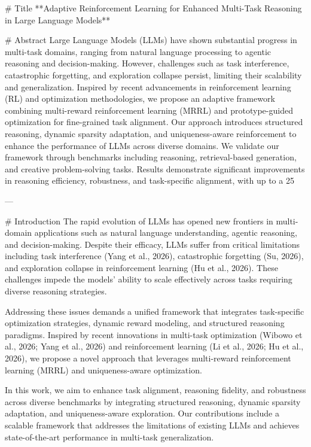 # Title  
**Adaptive Reinforcement Learning for Enhanced Multi-Task Reasoning in Large Language Models**  

# Abstract  
Large Language Models (LLMs) have shown substantial progress in multi-task domains, ranging from natural language processing to agentic reasoning and decision-making. However, challenges such as task interference, catastrophic forgetting, and exploration collapse persist, limiting their scalability and generalization. Inspired by recent advancements in reinforcement learning (RL) and optimization methodologies, we propose an adaptive framework combining multi-reward reinforcement learning (MRRL) and prototype-guided optimization for fine-grained task alignment. Our approach introduces structured reasoning, dynamic sparsity adaptation, and uniqueness-aware reinforcement to enhance the performance of LLMs across diverse domains. We validate our framework through benchmarks including reasoning, retrieval-based generation, and creative problem-solving tasks. Results demonstrate significant improvements in reasoning efficiency, robustness, and task-specific alignment, with up to a 25%

---

# Introduction  
The rapid evolution of LLMs has opened new frontiers in multi-domain applications such as natural language understanding, agentic reasoning, and decision-making. Despite their efficacy, LLMs suffer from critical limitations including task interference (Yang et al., 2026), catastrophic forgetting (Su, 2026), and exploration collapse in reinforcement learning (Hu et al., 2026). These challenges impede the models' ability to scale effectively across tasks requiring diverse reasoning strategies.  

Addressing these issues demands a unified framework that integrates task-specific optimization strategies, dynamic reward modeling, and structured reasoning paradigms. Inspired by recent innovations in multi-task optimization (Wibowo et al., 2026; Yang et al., 2026) and reinforcement learning (Li et al., 2026; Hu et al., 2026), we propose a novel approach that leverages multi-reward reinforcement learning (MRRL) and uniqueness-aware optimization.  

In this work, we aim to enhance task alignment, reasoning fidelity, and robustness across diverse benchmarks by integrating structured reasoning, dynamic sparsity adaptation, and uniqueness-aware exploration. Our contributions include a scalable framework that addresses the limitations of existing LLMs and achieves state-of-the-art performance in multi-task generalization.  

